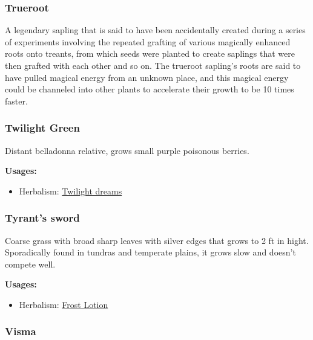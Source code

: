\subsubsection{Trueroot}

A legendary sapling that is said to have been accidentally created during a series of experiments involving the repeated grafting of various magically enhanced roots onto treants, from which seeds were planted to create saplings that were then grafted with each other and so on. The trueroot sapling's roots are said to have pulled magical energy from an unknown place, and this magical energy could be channeled into other plants to accelerate their growth to be 10 times faster.

\subsubsection{Twilight Green}
\label{Twilight Green}

Distant belladonna relative, grows small purple poisonous berries.

\vspace{5mm}

\textbf{Usages:}

\begin{itemize}[noitemsep]
\item[] Herbalism: \hyperref[Twilight dreams]{Twilight dreams}
\end{itemize}

\subsubsection{Tyrant's sword}
\label{Tyrant's Sword}

Coarse grass with broad sharp leaves with silver edges that grows to 2 ft in hight. Sporadically found in tundras and temperate plains, it grows slow and doesn't compete well.

\vspace{5mm}

\textbf{Usages:}

\begin{itemize}[noitemsep]
\item[] Herbalism: \hyperref[Frost Lotion]{Frost Lotion}
\end{itemize}

\subsubsection{Visma}
\label{Visma}

